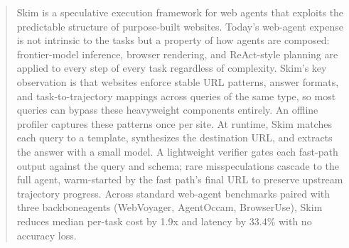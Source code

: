 \documentclass[sigplan]{acmart}
\begin{document}
\begin{abstract}


Skim is a speculative execution framework for web agents that exploits the predictable structure of purpose-built websites. Today's web-agent expense is not intrinsic to the tasks but a property of how agents are composed: frontier-model inference, browser rendering, and ReAct-style planning are applied to every step of every task regardless of complexity. Skim's key observation is that websites enforce stable URL patterns, answer formats, and task-to-trajectory mappings across queries of the same type, so most queries can bypass these heavyweight components entirely. An offline profiler captures these patterns once per site. At runtime, Skim matches each query to a template, synthesizes the destination URL, and extracts the answer with a small model. A lightweight verifier gates each fast-path output against the query and schema; rare misspeculations cascade to the full agent, warm-started by the fast path's final URL to preserve upstream trajectory progress. Across standard web-agent benchmarks paired with three backboneagents (WebVoyager, AgentOccam, BrowserUse), Skim reduces median per-task cost by 1.9x and latency by 33.4\% with no accuracy loss.

\end{abstract}
\end{document}
